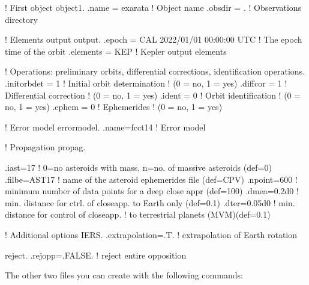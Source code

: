 \documentclass[letterpaper,11pt,english]{sphinxmanual}
\begin{document}
\begin{sphinxVerbatim}[commandchars=\\\{\}]
! First object
object1.
    .name = exarata        ! Object name
    .obs\PYGZus{}dir = \PYGZsq{}.\PYGZsq{}         ! Observations directory

! Elements output
output.
    .epoch = CAL 2022/01/01  00:00:00 UTC  ! The epoch time of the orbit
    .elements = \PYGZsq{}KEP\PYGZsq{}                      ! Kepler output elements

! Operations: preliminary orbits, differential corrections, identification
operations.
    .init\PYGZus{}orbdet = 1    ! Initial orbit determination
                        ! (0 = no, 1 = yes)
    .diffcor = 1        ! Differential correction
                        ! (0 = no, 1 = yes)
    .ident = 0          ! Orbit identification
                        ! (0 = no, 1 = yes)
    .ephem = 0          ! Ephemerides
                        ! (0 = no, 1 = yes)

! Error model
error\PYGZus{}model.
    .name=\PYGZsq{}fcct14\PYGZsq{}      ! Error model

! Propagation
propag.

    .iast=17         ! 0=no asteroids with mass, n=no. of massive asteroids (def=0)
    .filbe=\PYGZsq{}AST17\PYGZsq{}   ! name of the asteroid ephemerides file (def=\PYGZsq{}CPV\PYGZsq{})
    .npoint=600      ! minimum number of data points for a deep close appr (def=100)
    .dmea=0.2d0      ! min. distance for ctrl. of close\PYGZhy{}app. to Earth only (def=0.1)
        .dter=0.05d0    ! min. distance for control of close\PYGZhy{}app.
                        ! to terrestrial planets (MVM)(def=0.1)

! Additional options
IERS.
    .extrapolation=.T.  ! extrapolation of Earth rotation

reject.
    .rejopp=.FALSE.     ! reject entire opposition
\end{sphinxVerbatim}

\sphinxAtStartPar
The other two files you can create with the following commands:

\begin{sphinxVerbatim}[commandchars=\\\{\}]
   
 
\end{sphinxVerbatim}
\end{document}
